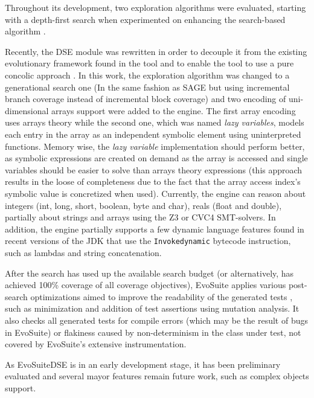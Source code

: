 \documentclass[conference]{IEEEtran}
\begin{document}
Throughout its development, two exploration algorithms were evaluated, starting with a depth-first search when experimented on enhancing the search-based algorithm \cite{ImprovingSBSTWithDSE}. 


Recently, the DSE module was rewritten in order to decouple it from the existing evolutionary framework found in the tool and to enable the tool to use a pure concolic approach \cite{TesisIgnacio}. 
In this work, the exploration algorithm was changed to a generational search one (In the same fashion as SAGE\cite{SAGE} but using incremental branch coverage instead of incremental block coverage) and two encoding of uni-dimensional arrays support were added to the engine. 
The first array encoding uses arrays theory while the second one, which was named \textit{lazy variables}, models each entry in the array as an independent symbolic element using uninterpreted functions. 
Memory wise, the \textit{lazy variable} implementation should perform better, as symbolic expressions are created on demand as the array is accessed and single variables should be easier to solve than arrays theory expressions (this approach results in the loose of completeness due to the fact that the array access index's symbolic value is concretized when used). 
Currently, the engine can reason about integers (int, long, short, boolean, byte and char), reals (float and double), partially about strings and arrays using the Z3 or CVC4 SMT-solvers. 
In addition, the engine partially supports a few dynamic language features found in recent versions of the JDK that use the \texttt{Invokedynamic} bytecode instruction, such as lambdas and string concatenation.

After the search has used up the available search budget (or alternatively, has achieved 100\% coverage of all coverage objectives), EvoSuite applies various post-search optimizations aimed to improve the readability of the generated tests \cite{evosuite, evosuitechallenge}, such as minimization and addition of test assertions using mutation analysis\cite{mutationDrivenOracles}. 
It also checks all generated tests for compile errors (which may be the result of bugs in EvoSuite) or flakiness caused by non-determinism in the class under test, not covered by EvoSuite's extensive instrumentation.

As EvoSuiteDSE is in an early development stage, it has been preliminary evaluated \cite{TesisIgnacio} and several mayor features remain future work, such as complex objects support.
\end{document}
